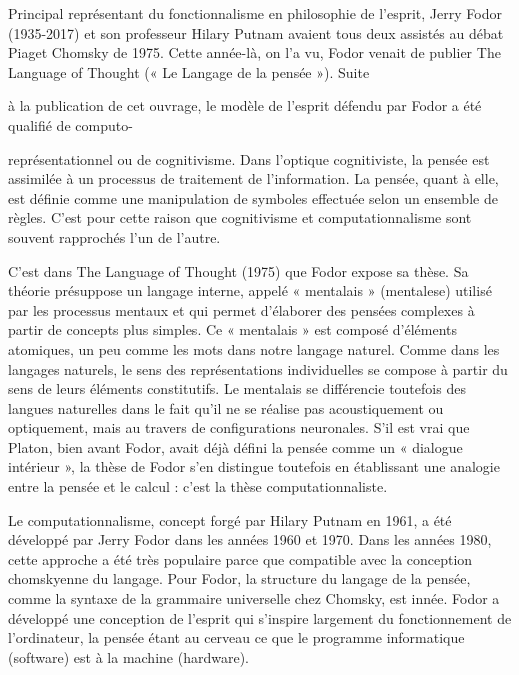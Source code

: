 
Principal représentant du fonctionnalisme en philosophie de l’esprit, Jerry Fodor (1935-2017) et son professeur Hilary Putnam avaient tous deux assistés au débat Piaget Chomsky de 1975. Cette année-là, on l’a vu, Fodor venait de publier The Language of Thought (« Le Langage de la pensée »). Suite\par


à la publication de cet ouvrage, le modèle de l’esprit défendu par Fodor a été qualifié de computo-\par

représentationnel ou de cognitivisme. Dans l’optique cognitiviste, la pensée est assimilée à un processus de traitement de l’information. La pensée, quant à elle, est définie comme une manipulation de symboles effectuée selon un ensemble de règles. C’est pour cette raison que cognitivisme et computationnalisme sont souvent rapprochés l’un de l’autre.\par

 C’est dans The Language of Thought (1975) que Fodor expose sa thèse. Sa théorie présuppose un langage interne, appelé « mentalais » (mentalese) utilisé par les processus mentaux et qui permet d’élaborer des pensées complexes à partir de concepts plus simples. Ce « mentalais » est composé d’éléments atomiques, un peu comme les mots dans notre langage naturel. Comme dans les langages naturels, le sens des représentations individuelles se compose à partir du sens de leurs éléments constitutifs. Le mentalais se différencie toutefois des langues naturelles dans le fait qu’il ne se réalise pas acoustiquement ou optiquement, mais au travers de configurations neuronales. S’il est vrai que Platon, bien avant Fodor, avait déjà défini la pensée comme un « dialogue intérieur », la thèse de Fodor s’en distingue toutefois en établissant une analogie entre la pensée et le calcul : c’est la thèse computationnaliste.\par


Le computationnalisme, concept forgé par Hilary Putnam en 1961, a été développé par Jerry Fodor dans les années 1960 et 1970. Dans les années 1980, cette approche a été très populaire parce que compatible avec la conception chomskyenne du langage. Pour Fodor, la structure du langage de la pensée, comme la syntaxe de la grammaire universelle chez Chomsky, est innée. Fodor a développé une conception de l'esprit qui s’inspire largement du fonctionnement de l’ordinateur, la pensée étant au cerveau ce que le programme informatique (software) est à la machine (hardware).\par

